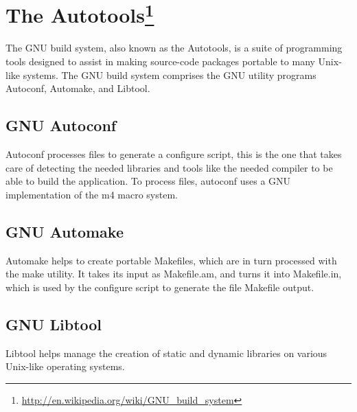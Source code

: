 
\section[The Autotools]{The Autotools\footnote{\url{http://en.wikipedia.org/wiki/GNU_build_system}}}

The GNU build system, also known as the Autotools, is a suite of programming tools designed to assist in making source-code packages portable to many Unix-like systems. The GNU build system comprises the GNU utility programs Autoconf, Automake, and Libtool.

\subsection{GNU Autoconf}\label{Autoconf}

Autoconf processes files to generate a configure script, this is the one that takes care of detecting the needed libraries and tools like the needed compiler to be able to build the application. To process files, autoconf uses a GNU implementation of the m4 macro system.

\subsection{GNU Automake}\label{Automake}

Automake helps to create portable Makefiles, which are in turn processed with the make utility. It takes its input as Makefile.am, and turns it into Makefile.in, which is used by the configure script to generate the file Makefile output.

\subsection{GNU Libtool}\label{Libtool}

Libtool helps manage the creation of static and dynamic libraries on various Unix-like operating systems.
